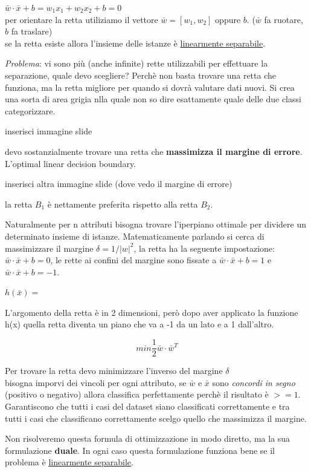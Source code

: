 $\bar{w} \cdot \bar{x} + b = w_1 x_1 + w_2 x_2 + b = 0$\\
per orientare la retta utiliziamo il vettore $\bar{w} = [w_1,w_2]$ oppure $b$. ($\bar{w}$ fa ruotare, $b$ fa traslare)\\
se la retta esiste allora l'insieme delle istanze è \underline{linearmente separabile}.

\textit{Problema}: vi sono pi\`u (anche infinite) rette utilizzabili per effettuare la separazione, quale devo scegliere? Perch\`e non basta trovare una retta che funziona, ma la retta migliore per quando si dovr\`a valutare dati nuovi. Si crea una sorta di area grigia nlla quale non so dire esattamente quale delle due classi categorizzare.

inserisci immagine slide 

devo sostanzialmente trovare una retta che \textbf{massimizza il margine di errore}. L'optimal linear decision boundary. 

inserisci altra immagine slide (dove vedo il margine di errore)

la retta $B_1$ è nettamente preferita rispetto alla retta $B_2$.

Naturalmente per n attributi bisogna trovare l'iperpiano ottimale per dividere un determinato insieme di istanze. Matematicamente parlando si cerca di massimizzare il margine $\delta = 1 / |w|^2$, la retta ha la seguente impostazione: $\bar{w} \cdot \bar{x} + b = 0$, le rette ai confini del margine sono fissate a $\bar{w} \cdot \bar{x} + b = 1$ e $\bar{w} \cdot \bar{x} + b = -1$. 

$h(\bar{x}) = $

L'argomento della retta \`e in 2 dimensioni, per\`o dopo aver applicato la funzione h(x) quella retta diventa un piano che va a -1 da un lato e a 1 dall'altro.

\[min \frac{1}{2}\bar{w} \cdot \bar{w}^T \]

Per trovare la retta devo minimizzare l'inverso del margine $\delta$\\
bisogna imporvi dei vincoli per ogni attributo, se $\bar{w}$ e $\bar{x}$ sono \textit{concordi in segno} (positivo o negativo) allora classifica perfettamente perch\`e il risultato è $>= 1$. Garantiscono che tutti i casi del dataset siano classificati correttamente e tra tutti i casi che classificano correttamente scelgo quello che massimizza il margine. 

Non risolveremo questa formula di ottimizzazione in modo diretto, ma la sua formulazione \textbf{duale}. In ogni caso questa formulazione funziona bene se il problema \`e \underline{linearmente separabile}.

